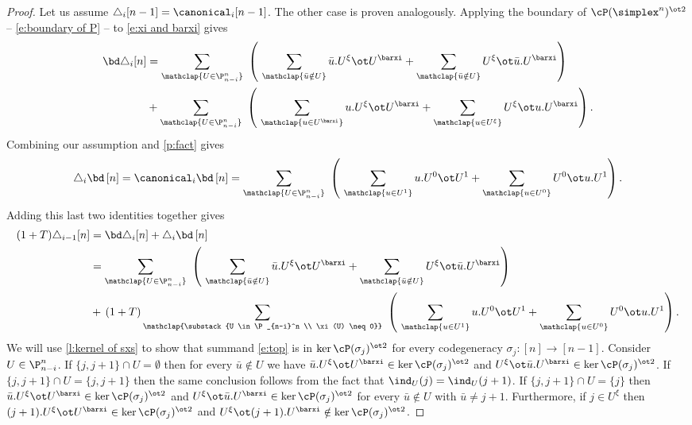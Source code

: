 \begin{proof}
	Let us assume $\triangle_i [n-1] = \canonical_i [n-1]$.
	The other case is proven analogously.
	Applying the boundary of $\cP(\simplex^n)^{\ot 2}$ -- \cref{e:boundary of P} -- to \cref{e:xi and barxi} gives
	\begin{align*}
		\bd \triangle_i [n] & =
		\sum_{\mathclap{U \in \P_{n-i}^n}} \
		\left(\
		\sum_{\mathclap{\bar u \notin U}} \bar u.U^\xi \ot U^\barxi +
		\sum_{\mathclap{\bar u \notin U}} U^\xi \ot \bar u.U^\barxi
		\right) \\ & +
		\sum_{\mathclap{U \in \P_{n-i}^n}} \
		\left(\
		\sum_{\mathclap{u \in U^\barxi}} u.U^\xi \ot U^\barxi +
		\sum_{\mathclap{u \in U^{\xi}}} U^\xi \ot u.U^\barxi
		\right).
	\end{align*}
	Combining our assumption and \cref{p:fact} gives
	\[
	\triangle_i \bd \, [n] =
	\canonical_i \bd \, [n] =
	\sum_{\mathclap{U \in \P_{n-i}^n}} \
	\left(\
	\sum_{\mathclap{u \in U^1}} u.U^0 \ot U^1 +
	\sum_{\mathclap{u \in U^0}} U^0 \ot u.U^1
	\right).
	\]
	Adding this last two identities together gives
	\begin{align}
		(1+T) \triangle_{i-1} [n] &=
		\bd \triangle_i [n] + \triangle_i \bd \, [n] \\ &=
		\label{e:top} \sum_{\mathclap{U \in \P_{n-i}^n}} \
		\left(\
		\sum_{\mathclap{\bar u \notin U}} \bar u.U^\xi \ot U^\barxi +
		\sum_{\mathclap{\bar u \notin U}} U^\xi \ot \bar u.U^\barxi
		\right) \\ &+ \,
		\label{e:bottom} (1+T) \sum_{\mathclap{\substack{U \in \P_{n-i}^n \\ \xi(U) \neq 0}}} \
		\left(\
		\sum_{\mathclap{u \in U^1}} u.U^0 \ot U^1 +
		\sum_{\mathclap{u \in U^0}} U^0 \ot u.U^1
		\right).
	\end{align}
	We will use \cref{l:kernel of sxs} to show that summand \eqref{e:top} is in $\ker \cP(\sigma_j)^{\ot 2}$ for every codegeneracy $\sigma_j \colon [n] \to [n-1]$.
	Consider $U \in \P_{n-i}^n$.
	If $\{j, j+1\} \cap U = \emptyset$ then for every $\bar u \notin U$ we have $\bar u.U^\xi \ot U^\barxi \in \ker \cP(\sigma_j)^{\ot 2}$ and $U^\xi \ot \bar u.U^\barxi \in \ker \cP(\sigma_j)^{\ot 2}$.
	If $\{j, j+1\} \cap U = \{j, j+1\}$ then the same conclusion follows from the fact that $\ind_U(j) = \ind_U(j+1)$.
	If $\{j, j+1\} \cap U = \{j\}$ then $\bar u.U^\xi \ot U^\barxi \in \ker \cP(\sigma_j)^{\ot 2}$ and $U^\xi \ot \bar u.U^\barxi \in \ker \cP(\sigma_j)^{\ot 2}$ for every $\bar u \notin U$ with $\bar u \neq j+1$.
	Furthermore, if $j \in U^\xi$ then $(j+1).U^\xi \ot U^\barxi \in \ker \cP(\sigma_j)^{\ot 2}$ and $U^\xi \ot (j+1).U^\barxi \notin \ker \cP(\sigma_j)^{\ot 2}$.

\end{proof}
